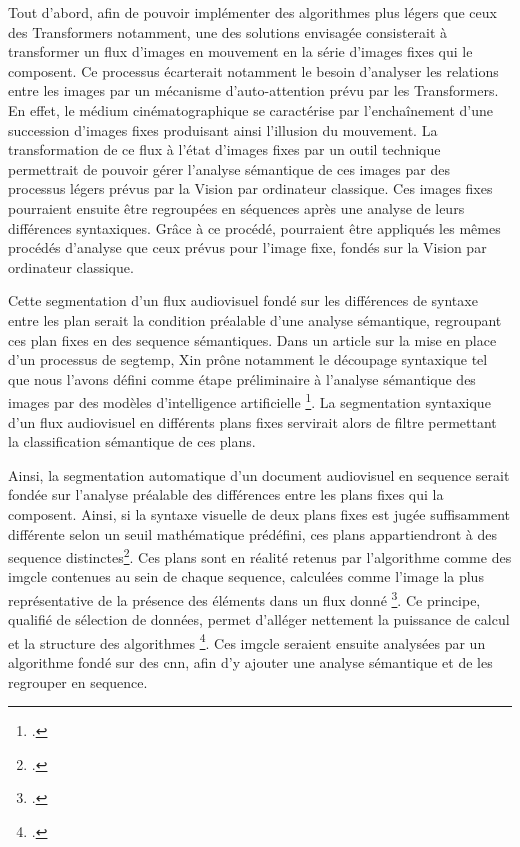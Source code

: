 Tout d'abord, afin de pouvoir implémenter des algorithmes plus légers que ceux des \gls{Transformers} notamment, une des solutions envisagée consisterait à transformer un flux d'images en mouvement en la série d'images fixes qui le composent. Ce processus écarterait notamment le besoin d'analyser les relations entre les images par un mécanisme d'auto-attention prévu par les \gls{Transformers}. En effet, le médium cinématographique se caractérise par l'enchaînement d'une succession d'images fixes produisant ainsi l'illusion du mouvement. La transformation de ce flux à l'état d'images fixes par un outil technique permettrait de pouvoir gérer l'analyse sémantique de ces images par des processus légers prévus par la \gls{Vision par ordinateur} classique. Ces images fixes pourraient ensuite être regroupées en séquences après une analyse de leurs différences syntaxiques. Grâce à ce procédé, pourraient être appliqués les mêmes procédés d'analyse que ceux prévus pour l'image fixe, fondés sur la \gls{Vision par ordinateur} classique. 

Cette segmentation d'un flux audiovisuel fondé sur les différences de syntaxe entre les \gls{plan} serait la condition préalable d'une analyse sémantique, regroupant ces \gls{plan} fixes en des \gls{sequence} sémantiques. Dans un article sur la mise en place d'un processus de \gls{segtemp}, Xin prône notamment le découpage syntaxique tel que nous l'avons défini comme étape préliminaire à l'analyse sémantique des images par des modèles d'intelligence artificielle \footcite{xin2023}. La segmentation syntaxique d'un flux audiovisuel en différents plans fixes servirait alors de filtre permettant la classification sémantique de ces plans. 

Ainsi, la segmentation automatique d'un document audiovisuel en \gls{sequence} serait fondée sur l'analyse préalable des différences entre les plans fixes qui la composent. Ainsi, si la syntaxe visuelle de deux plans fixes est jugée suffisamment différente selon un seuil mathématique prédéfini, ces plans appartiendront à des \gls{sequence} distinctes\footcite{xin2023}. Ces plans sont en réalité retenus par l'algorithme comme des \gls{imgcle} contenues au sein de chaque \gls{sequence}, calculées comme l'image la plus représentative de la présence des éléments dans un flux donné \footcite{xin2023}. Ce principe, qualifié de sélection de données, permet d'alléger nettement la puissance de calcul et la structure des algorithmes \footcite{xin2023}. Ces \gls{imgcle} seraient ensuite analysées par un algorithme fondé sur des \gls{cnn}, afin d'y ajouter une analyse sémantique et de les regrouper en \gls{sequence}. 

